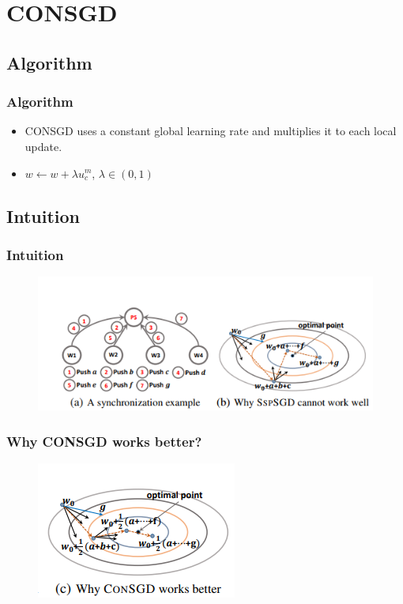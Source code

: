 \section{CONSGD}

\subsection{Algorithm}
\begin{frame}
    \frametitle{Algorithm}
	\begin{itemize}
		\item CONSGD uses a constant global learning rate and multiplies it to each local update. 
		\item $w\gets w+\lambda u_{c}^{m} $, $\lambda \in (0,1)$
	\end{itemize}
\end{frame}

\subsection{Intuition}
\begin{frame}
    \frametitle{Intuition}
	\begin{figure}
		\includegraphics[scale=0.5]{figure/intuition.png}
	\end{figure} 
\end{frame}

\begin{frame}
	\frametitle{Why CONSGD works better?}
	\begin{figure}
		\includegraphics[scale=0.8]{figure/consgdwork.png}
	\end{figure}
\end{frame}



